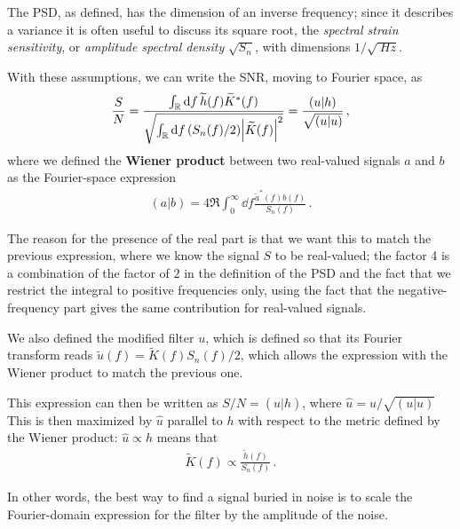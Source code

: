 \documentclass[main.tex]{subfiles}
\begin{document}
The \ac{PSD}, as defined, has the dimension of an inverse frequency; since it describes a variance it is often useful to discuss its square root, the \emph{spectral strain sensitivity}, or \emph{amplitude spectral density} \(\sqrt{S_n}\), with dimensions \(1/ \sqrt{ \SI{}{Hz}}\). 

With these assumptions, we can write the \ac{SNR}, moving to Fourier space, as \cite[eq.\ 7.45]{maggioreGravitationalWavesVolume2007}
%
\begin{align} \label{eq:snr}
\frac{S}{N} = \frac{\int_{\mathbb{R}} \dd{f} \widetilde{h}(f) \widetilde{K}^{*}(f) }{\sqrt{\int_{\mathbb{R}} \dd{f} (S_n(f) / 2) \abs{\widetilde{K}(f)}^2}} = \frac{(u|h)}{\sqrt{(u|u)}}
\,,
\end{align}
%
where we defined the \textbf{Wiener product} between two real-valued signals \(a\) and \(b\) as the Fourier-space expression \cites{finnDetectionMeasurementGravitational1992}[eq.\ 7.46]{maggioreGravitationalWavesVolume2007}
%
\begin{align}
(a | b) = 4 \Re \int_{0}^{\infty } \dd{f} \frac{ \widetilde{a}^{*} (f) b(f)}{S_n(f)}
\,.
\end{align}

The reason for the presence of the real part is that we want this to match the previous expression, where we know the signal \(S\) to be real-valued; the factor 4 is a combination of the factor of \(2\) in the definition of the \ac{PSD} and the fact that we restrict the integral to positive frequencies only, using the fact that the negative-frequency part gives the same contribution for real-valued signals.

We also defined the modified filter \(u\), which is defined so that its Fourier transform reads \(\widetilde{u}(f) = \widetilde{K}(f) S_n(f) / 2\), which allows the expression with the Wiener product to match the previous one.

This expression can then be written as \(S/N = (\hat{u} | h)\), where \(\hat{u} = u / \sqrt{(u|u)}\) This is then maximized by \(\hat{u}\) parallel to \(h\) with respect to the metric defined by the Wiener product: \(\hat{u} \propto h\) means that 
%
\begin{align}
\widetilde{K}(f) \propto \frac{\widetilde{h}(f)}{S_n(f)}
\,.
\end{align}

In other words, the best way to find a signal buried in noise is to scale the Fourier-domain expression for the filter by the amplitude of the noise. 
\end{document}
